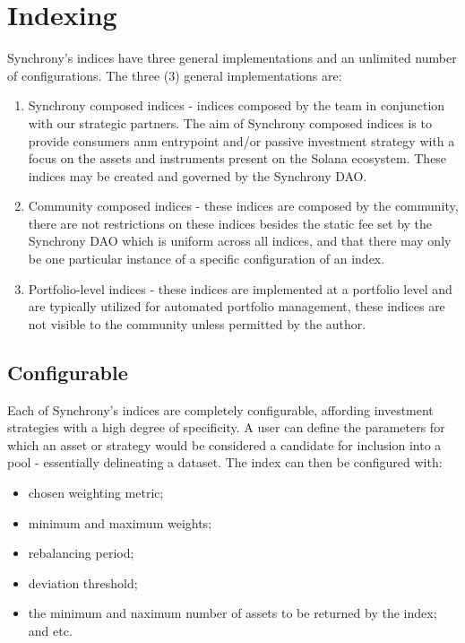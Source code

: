 \documentclass[10pt]{article}
\begin{document}
					\section{Indexing}
					Synchrony's indices have three general implementations and an unlimited number
					of configurations. The three (3) general implementations are:
					\begin{enumerate}
						\item Synchrony composed indices - indices composed by the team in
							conjunction with our strategic partners. The aim of Synchrony composed
							indices is to provide consumers anm entrypoint and/or passive investment
							strategy with a focus on the assets and instruments present on the
							Solana ecosystem. These indices may be created and governed by the
							Synchrony DAO.
						\item Community composed indices - these indices are composed by the
							community, there are not restrictions on these indices besides the
							static fee set by the Synchrony DAO which is uniform across all indices,
							and that there may only be one particular instance of a specific
							configuration of an index.
						\item Portfolio-level indices - these indices are implemented at a portfolio
							level and are typically utilized for automated portfolio management,
							these indices are not visible to the community unless permitted by the
							author.
					\end{enumerate}

					\subsection{Configurable}
					Each of Synchrony's indices are completely configurable, affording investment
					strategies with a high degree of specificity. A user can define the parameters
					for which an asset or strategy would be considered a candidate for inclusion
					into a pool - essentially delineating a dataset. The index can then be
					configured with:
					\begin{itemize}
						\item chosen weighting metric; 
						\item minimum and maximum weights;
						\item rebalancing period; 
						\item deviation threshold; 
						\item the minimum and naximum number of assets to be returned by the index;
							and etc.
					\end{itemize}
\end{document}
